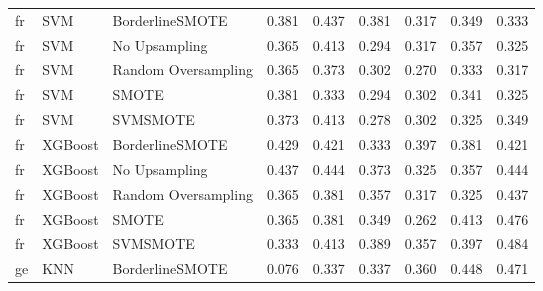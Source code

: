 \begin{tabular}{lllllllll}
      fr &                          SVM &     BorderlineSMOTE &     0.381 &                     0.437 &                 0.381 &                  0.317 &                                   0.349 &     0.333 \\
      fr &                          SVM &       No Upsampling &     0.365 &                     0.413 &                 0.294 &                  0.317 &                                   0.357 &     0.325 \\
      fr &                          SVM & Random Oversampling &     0.365 &                     0.373 &                 0.302 &                  0.270 &                                   0.333 &     0.317 \\
      fr &                          SVM &               SMOTE &     0.381 &                     0.333 &                 0.294 &                  0.302 &                                   0.341 &     0.325 \\
      fr &                          SVM &            SVMSMOTE &     0.373 &                     0.413 &                 0.278 &                  0.302 &                                   0.325 &     0.349 \\
      fr &                      XGBoost &     BorderlineSMOTE &     0.429 &                     0.421 &                 0.333 &                  0.397 &                                   0.381 &     0.421 \\
      fr &                      XGBoost &       No Upsampling &     0.437 &                     0.444 &                 0.373 &                  0.325 &                                   0.357 &     0.444 \\
      fr &                      XGBoost & Random Oversampling &     0.365 &                     0.381 &                 0.357 &                  0.317 &                                   0.325 &     0.437 \\
      fr &                      XGBoost &               SMOTE &     0.365 &                     0.381 &                 0.349 &                  0.262 &                                   0.413 &     0.476 \\
      fr &                      XGBoost &            SVMSMOTE &     0.333 &                     0.413 &                 0.389 &                  0.357 &                                   0.397 &     0.484 \\
      ge &                          KNN &     BorderlineSMOTE &     0.076 &                     0.337 &                 0.337 &                  0.360 &                                   0.448 &     0.471 \\

\end{tabular}
